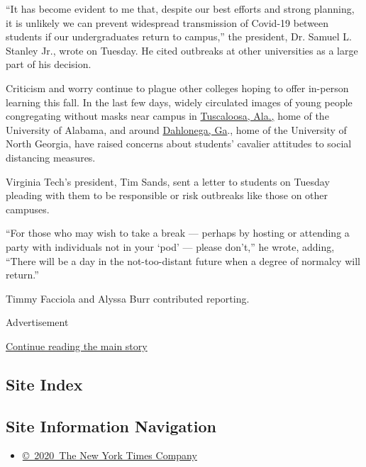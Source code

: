 ``It has become evident to me that, despite our best efforts and strong
planning, it is unlikely we can prevent widespread transmission of
Covid-19 between students if our undergraduates return to campus,'' the
president, Dr. Samuel L. Stanley Jr., wrote on Tuesday. He cited
outbreaks at other universities as a large part of his decision.

Criticism and worry continue to plague other colleges hoping to offer
in-person learning this fall. In the last few days, widely circulated
images of young people congregating without masks near campus in
\href{https://abc3340.com/news/coronavirus/social-media-images-of-lines-outside-tuscaloosa-bars-draws-ire-of-alabamas-ad}{Tuscaloosa,
Ala.,} home of the University of Alabama, and around
\href{https://www.facebookcorewwwi.onion/watch/?v=905235006636836}{Dahlonega,
Ga}., home of the University of North Georgia, have raised concerns
about students' cavalier attitudes to social distancing measures.

Virginia Tech's president, Tim Sands, sent a letter to students on
Tuesday pleading with them to be responsible or risk outbreaks like
those on other campuses.

``For those who may wish to take a break --- perhaps by hosting or
attending a party with individuals not in your `pod' --- please don't,''
he wrote, adding, ``There will be a day in the not-too-distant future
when a degree of normalcy will return.''

Timmy Facciola and Alyssa Burr contributed reporting.

Advertisement

\protect\hyperlink{after-bottom}{Continue reading the main story}

\hypertarget{site-index}{%
\subsection{Site Index}\label{site-index}}

\hypertarget{site-information-navigation}{%
\subsection{Site Information
Navigation}\label{site-information-navigation}}

\begin{itemize}
\tightlist
\item
  \href{https://help.nytimes3xbfgragh.onion/hc/en-us/articles/115014792127-Copyright-notice}{©~2020~The
  New York Times Company}
\end{itemize}

